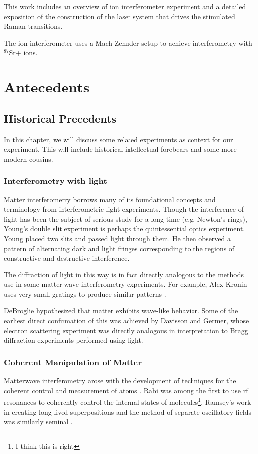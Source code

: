 

This work includes an overview of ion interferometer experiment and a detailed exposition of the construction of the laser system that drives the stimulated Raman transitions.

The ion interferometer uses a Mach-Zehnder setup to achieve interferometry with $^{87}$Sr+ ions.


\chapter{Antecedents}
\section{Historical Precedents}
In this chapter, we will discuss some related experiments as context for our experiment. This will include historical intellectual forebears and some more modern cousins. 
 \subsection{Interferometry with light}
Matter interferometry borrows many of its foundational concepts and terminology from interferometric light experiments. Though the interference of light has been the subject of serious study for a long time (e.g. Newton's rings), Young's double slit experiment is perhaps the quintessential optics experiment. Young placed two slits and passed light through them. He then observed a pattern of alternating dark and light fringes corresponding to the regions of constructive and destructive interference. 

The diffraction of light in this way is in fact directly analogous to the methods use in some matter-wave interferometry experiments. For example, Alex Kronin uses very small gratings to produce similar patterns \cite{Kronin_RMP}. 

DeBroglie hypothesized that matter exhibits wave-like behavior. Some of the earliest direct confirmation of this was achieved by Davisson and Germer, whose electron scattering experiment was directly analogous in interpretation to Bragg diffraction experiments performed using light. 

\subsection{Coherent Manipulation of Matter}
Matterwave interferometry arose with the development of techniques for the coherent control and measurement of atoms \cite{Kronin_RMP}. Rabi was among the first to use rf resonances to coherently control the internal states of molecules\footnote{I think this is right}. Ramsey's work in creating long-lived superpositions and the method of separate oscillatory fields was similarly seminal \cite{Kronin_RMP}. 

